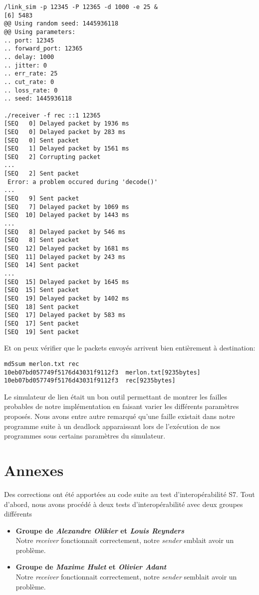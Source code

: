 \documentclass[11pt,a4paper]{article}
\begin{document}
\begin{lstlisting}
/link_sim -p 12345 -P 12365 -d 1000 -e 25 &
[6] 5483
@@ Using random seed: 1445936118
@@ Using parameters:
.. port: 12345
.. forward_port: 12365
.. delay: 1000
.. jitter: 0
.. err_rate: 25
.. cut_rate: 0
.. loss_rate: 0
.. seed: 1445936118

./receiver -f rec ::1 12365
[SEQ   0] Delayed packet by 1936 ms
[SEQ   0] Delayed packet by 283 ms
[SEQ   0] Sent packet
[SEQ   1] Delayed packet by 1561 ms
[SEQ   2] Corrupting packet
...
[SEQ   2] Sent packet
 Error: a problem occured during 'decode()'
...
[SEQ   9] Sent packet
[SEQ   7] Delayed packet by 1069 ms
[SEQ  10] Delayed packet by 1443 ms
...
[SEQ   8] Delayed packet by 546 ms
[SEQ   8] Sent packet
[SEQ  12] Delayed packet by 1681 ms
[SEQ  11] Delayed packet by 243 ms
[SEQ  14] Sent packet
...
[SEQ  15] Delayed packet by 1645 ms
[SEQ  15] Sent packet
[SEQ  19] Delayed packet by 1402 ms
[SEQ  18] Sent packet
[SEQ  17] Delayed packet by 583 ms
[SEQ  17] Sent packet
[SEQ  19] Sent packet
\end{lstlisting} 
 
Et on peux vérifier que le packets envoyés arrivent bien entièrement à destination:

\begin{lstlisting}
md5sum merlon.txt rec
10eb07bd057749f5176d43031f9112f3  merlon.txt[9235bytes]
10eb07bd057749f5176d43031f9112f3  rec[9235bytes]
\end{lstlisting} 
 
\vspace{3mm}

Le simulateur de lien était un bon outil permettant de montrer les failles probables de notre implémentation en faisant varier les différents paramètres proposés. Nous avons entre autre remarqué qu'une faille existait dans notre programme suite à un deadlock apparaissant lors de l'exécution de nos programmes sous certains paramètres du simulateur. 

\section{Annexes}

Des corrections ont été apportées au code suite au test d'interopérabilité S7. Tout d'abord, nous avons procédé à deux tests d'interopérabilité avec deux groupes différents

\begin{itemize}
\item{\textbf{Groupe de \textit{Alexandre Olikier} et \textit{Louis Reynders}} \\ Notre \textit{receiver} fonctionnait correctement, notre \textit{sender} smblait avoir un problème.}
\item{\textbf{\textbf{Groupe de \textit{Maxime Hulet} et \textit{Olivier Adant}}} \\ Notre \textit{receiver} fonctionnait correctement, notre \textit{sender} semblait avoir un problème.}
\end{itemize}
\end{document}
